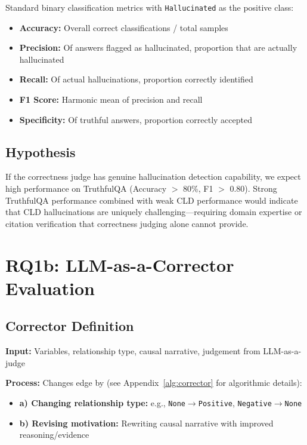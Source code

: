 Standard binary classification metrics with \texttt{Hallucinated} as the positive class:
\begin{itemize}[noitemsep]
    \item \textbf{Accuracy:} Overall correct classifications / total samples
    \item \textbf{Precision:} Of answers flagged as hallucinated, proportion that are actually hallucinated
    \item \textbf{Recall:} Of actual hallucinations, proportion correctly identified
    \item \textbf{F1 Score:} Harmonic mean of precision and recall
    \item \textbf{Specificity:} Of truthful answers, proportion correctly accepted
\end{itemize}

\subsection{Hypothesis}

If the correctness judge has genuine hallucination detection capability, we expect high performance on TruthfulQA (Accuracy $>$ 80\%, F1 $>$ 0.80). Strong TruthfulQA performance combined with weak CLD performance would indicate that CLD hallucinations are uniquely challenging---requiring domain expertise or citation verification that correctness judging alone cannot provide.

\section{RQ1b: LLM-as-a-Corrector Evaluation}

\subsection{Corrector Definition}
\textbf{Input:} Variables, relationship type, causal narrative, judgement from LLM-as-a-judge

\textbf{Process:} Changes edge by (see Appendix~\ref{alg:corrector} for algorithmic details):
\begin{itemize}[noitemsep]
    \item \textbf{a) Changing relationship type:} e.g., \texttt{None}$\rightarrow$\texttt{Positive}, \texttt{Negative}$\rightarrow$\texttt{None}
    \item \textbf{b) Revising motivation:} Rewriting causal narrative with improved reasoning/evidence
\end{itemize}

